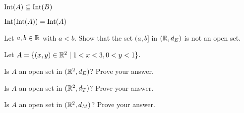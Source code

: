 \item  $\text{Int}(A) \subseteq \text{Int}(B)$

\item $\text{Int}(\text{Int}(A)) = \text{Int}(A)$

\ea

\begin{comment}

\ExerciseSolution

\ba

\item Let $x \in \Int(A)$. Then there exists $r > 0$ such that $B = B(a,r) \subseteq A \subseteq(B)$. So $x \in \Int(B)$ and $\Int(A) \subseteq \Int(B)$.

\item Since $\Int(A)$ is an open set, it is equal to its interior. Therefore, $\Int(\Int(A)) = \Int(A)$.

\ea


\end{comment}


\item Let $a, b \in \mathbb{R}$ with $a < b$. Show that the set $(a,b]$ in $(\mathbb{R}, d_E)$ is not an open set. 

\begin{comment}

\ExerciseSolution Consider the point $b$. Any open ball $B(b,r)$ with $r > 0$ contains the point $b+\frac{r}{2}$, which is not in $(a,b]$. So $b \notin \Int((a,b])$ and $(a,b]$ is not an open set. 

\end{comment}

\item Let $A = \{(x,y) \in \mathbb{R}^2 \mid 1 < x < 3, 0 < y < 1\}$. 

\ba
\item Is $A$ an open set in $(\mathbb{R}^2, d_E)$? Prove your answer. 

\item Is $A$ an open set in $(\mathbb{R}^2, d_T)$? Prove your answer. 

\item Is $A$ an open set in $(\mathbb{R}^2, d_M)$? Prove your answer. 

\ea

